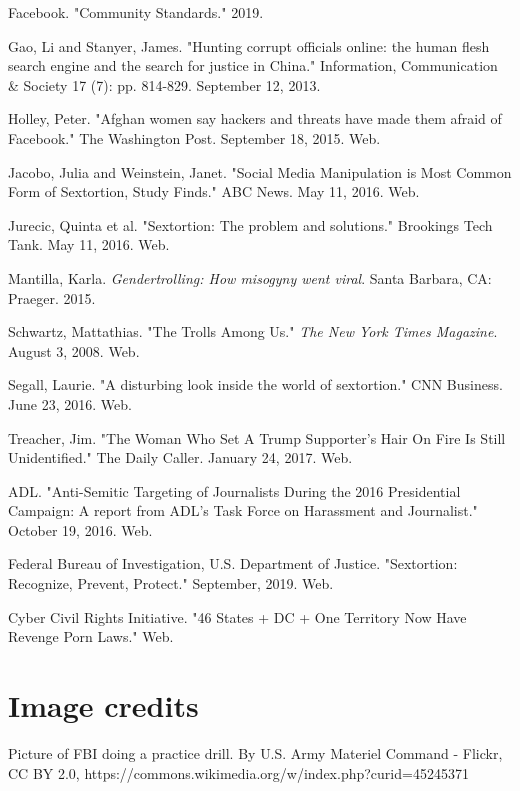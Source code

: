 \documentclass[class=book, crop=false]{standalone}
\begin{document}
Facebook. "Community Standards." 2019.

Gao, Li and Stanyer, James. "Hunting corrupt officials online: the human flesh search engine and the search for justice in China." Information, Communication \& Society 17 (7): pp. 814-829. September 12, 2013.

Holley, Peter. "Afghan women say hackers and threats have made them afraid of Facebook." The Washington Post. September 18, 2015. Web.

Jacobo, Julia and Weinstein, Janet. "Social Media Manipulation is Most Common Form of Sextortion, Study Finds." ABC News. May 11, 2016. Web.

Jurecic, Quinta et al. "Sextortion: The problem and solutions." Brookings Tech Tank. May 11, 2016. Web.

Mantilla, Karla. \textit{Gendertrolling: How misogyny went viral}. Santa Barbara, CA: Praeger. 2015.

Schwartz, Mattathias. "The Trolls Among Us." \textit{The New York Times Magazine}. August 3, 2008. Web.

Segall, Laurie. "A disturbing look inside the world of sextortion." CNN Business. June 23, 2016. Web.

Treacher, Jim. "The Woman Who Set A Trump Supporter's Hair On Fire Is Still Unidentified." The Daily Caller. January 24, 2017. Web.

ADL. "Anti-Semitic Targeting of Journalists During the 2016 Presidential Campaign: A report from ADL's Task Force on Harassment and Journalist." October 19, 2016. Web.

Federal Bureau of Investigation, U.S. Department of Justice. "Sextortion: Recognize, Prevent, Protect." September, 2019. Web.

Cyber Civil Rights Initiative. "46 States + DC + One Territory Now Have Revenge Porn Laws." Web.

\section{Image credits}

Picture of FBI doing a practice drill. By U.S. Army Materiel Command - Flickr, CC BY 2.0, https://commons.wikimedia.org/w/index.php?curid=45245371
\end{document}
